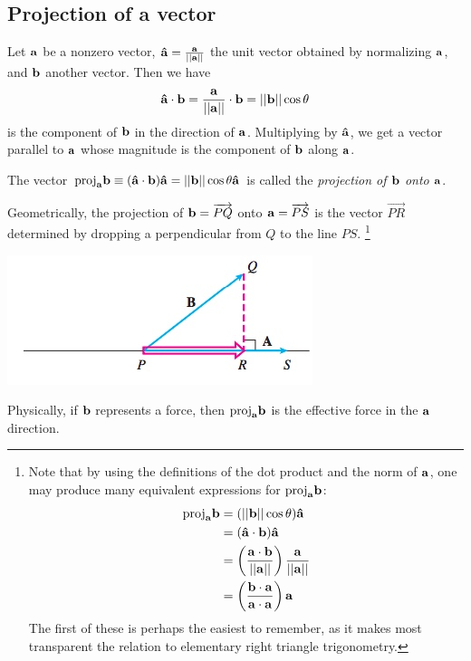 \documentclass[12pt,letterpaper,reqno]{article}
\numberwithin{equation}{section}
\newcommand{\ti}[1]{\textit{#1}}
\begin{document}
\subsection{Projection of a vector}
Let ${\bf a}$ be a nonzero vector, ${\bf \hat{a}}=\frac{{\bf a}}{||{\bf a}||}$ the unit vector obtained by normalizing ${\bf a}$, and ${\bf b}$ another vector. Then we have
\begin{align*}
	{\bf \hat{a}}\cdot {\bf b}=\frac{{\bf a}}{||{\bf a}||} \cdot {\bf b}=||{\bf b}||\cos \theta
\end{align*} 
is the component of ${\bf b}$ in the direction of ${\bf a}$. Multiplying by ${\bf \hat{a}}$, we get a vector parallel to ${\bf a}$ whose magnitude is the component of ${\bf b}$ along ${\bf a}$.

\begin{defn}
	The vector $\text{proj}_{\bf a}{\bf b}\equiv ({\bf \hat{a}}\cdot {\bf b}){\bf \hat{a}}=||{\bf b}||\cos \theta {\bf \hat{a}}$ is called the \ti{projection of ${\bf b}$ onto ${\bf a}$}.
\end{defn}
Geometrically, the projection of ${\bf b}=\overrightarrow{PQ}$ onto ${\bf a}=\overrightarrow{PS}$ is the vector $\overrightarrow{PR}$ determined by dropping a perpendicular from $Q$ to the line $PS$. \footnote{Note that by using the definitions of the dot product and the norm of ${\bf a}$, one may produce many equivalent expressions for $\text{proj}_{\bf a}{\bf b}$:
\begin{align*}
	\text{proj}_{\bf a}{\bf b}&=(||{\bf b}||\cos \theta){\bf \hat{a}} \\
	&=({\bf \hat{a}}\cdot {\bf b}){\bf \hat{a}} \\
	&=\left(\frac{{\bf a}\cdot {\bf b}}{||{\bf a}||}\right)\frac{{\bf a}}{||{\bf a}||} \\
	&=\left(\frac{{\bf b}\cdot {\bf a}}{{\bf a}\cdot {\bf a}}\right){\bf a}
\end{align*}
The first of these is perhaps the easiest to remember, as it makes most transparent the relation to elementary right triangle trigonometry.}

\begin{center}
	\includegraphics[scale=0.5]{figures_mvc/vector_projection_def}
\end{center}
Physically, if ${\bf b}$ represents a force, then $\text{proj}_{\bf a}{\bf b}$ is the effective force in the ${\bf a}$ direction.
\end{document}
